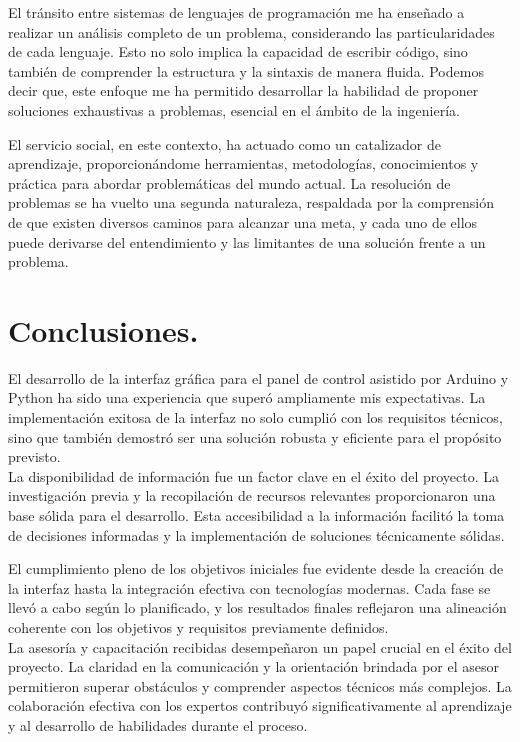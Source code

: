 \documentclass[a4paper,12pt]{article}
\begin{document}
        El tránsito entre sistemas de lenguajes de programación me ha enseñado a realizar un análisis completo de un problema, considerando las particularidades de cada lenguaje. Esto no solo implica la capacidad de escribir código, sino también de comprender la estructura y la sintaxis de manera fluida. Podemos decir que, este enfoque me ha permitido desarrollar la habilidad de proponer soluciones exhaustivas a problemas, esencial en el ámbito de la ingeniería.

        El servicio social, en este contexto, ha actuado como un catalizador de aprendizaje, proporcionándome herramientas, metodologías, conocimientos y práctica para abordar problemáticas del mundo actual. La resolución de problemas se ha vuelto una segunda naturaleza, respaldada por la comprensión de que existen diversos caminos para alcanzar una meta, y cada uno de ellos puede derivarse del entendimiento y las limitantes de una solución frente a un problema.

    \section{Conclusiones.}
        El desarrollo de la interfaz gráfica para el panel de control asistido por Arduino y Python ha sido una experiencia que superó ampliamente mis expectativas. La implementación exitosa de la interfaz no solo cumplió con los requisitos técnicos, sino que también demostró ser una solución robusta y eficiente para el propósito previsto.\\
        La disponibilidad de información fue un factor clave en el éxito del proyecto. La investigación previa y la recopilación de recursos relevantes proporcionaron una base sólida para el desarrollo. Esta accesibilidad a la información facilitó la toma de decisiones informadas y la implementación de soluciones técnicamente sólidas.
        
        El cumplimiento pleno de los objetivos iniciales fue evidente desde la creación de la interfaz hasta la integración efectiva con tecnologías modernas. Cada fase se llevó a cabo según lo planificado, y los resultados finales reflejaron una alineación coherente con los objetivos y requisitos previamente definidos.\\
        La asesoría y capacitación recibidas desempeñaron un papel crucial en el éxito del proyecto. La claridad en la comunicación y la orientación brindada por el asesor permitieron superar obstáculos y comprender aspectos técnicos más complejos. La colaboración efectiva con los expertos contribuyó significativamente al aprendizaje y al desarrollo de habilidades durante el proceso.
        
\end{document}
